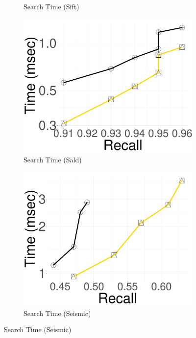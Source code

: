 \begin{figure}[htbp]
\begin{subfigure}[b]{0.2325\textwidth}
        \caption{Search Time (Sift)}
        \label{fig:hnswdpa:25:25GB_Sift_Time}
    \end{subfigure}
    \begin{subfigure}[b]{0.2325\textwidth}
        \captionsetup{justification=centering}
	\centering	
        \includegraphics[width=\textwidth]{../img/oigas/PQVSPQS/25GB/sald_10_Time.pdf}
        \caption{Search Time (Sald)}
        \label{fig:hnswdpa:25:25GB_Sald_Time}
    \end{subfigure}
    \begin{subfigure}[b]{0.2325\textwidth}
        \captionsetup{justification=centering}
	\centering	
        \includegraphics[width=\textwidth]{../img/oigas/PQVSPQS/25GB/seismic_10_Time.pdf}
        \caption{Search Time (Seismic)}
        \label{fig:hnswdpa:25:25GB_Seismic_Time}
    \end{subfigure}
    

\end{figure}
